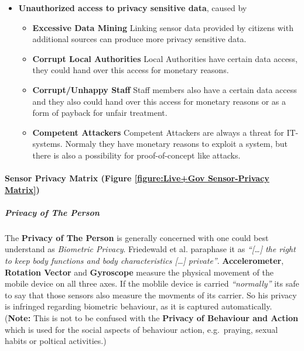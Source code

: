 

\begin{itemize}

\item
  \textbf{Unauthorized access to privacy sensitive data}, caused by
  \begin{itemize}
  \item
    \textbf{Excessive Data Mining} Linking sensor data provided by
    citizens with additional sources can produce more privacy sensitive
    data.
  \item
    \textbf{Corrupt Local Authorities} Local Authorities have certain data
    access, they could hand over this access for monetary reasons.
  \item
    \textbf{Corrupt/Unhappy Staff} Staff members also have a certain data
    access and they also could hand over this access for monetary reasons
    or as a form of payback for unfair treatment.
  \item
    \textbf{Competent Attackers} Competent Attackers are always a threat
    for IT-systems. Normaly they have monetary reasons to exploit a
    system, but there is also a possibility for proof-of-concept like
    attacks.
  \end{itemize}
\end{itemize}


\paragraph{Sensor Privacy Matrix (Figure \ref{figure:Live+Gov Sensor-Privacy Matrix})}



\subparagraph{Privacy of The Person}

The \textbf{Privacy of The Person} is generally concerned with one could
best understand as \emph{Biometric Privacy}. Friedewald et al. paraphase
it as \emph{``{[}\ldots{}{]} the right to keep body functions and body
characteristics {[}\ldots{}{]} private''}. \textbf{Accelerometer},
\textbf{Rotation Vector} and \textbf{Gyroscope} measure the physical
movement of the mobile device on all three axes. If the moblile device
is carried \emph{``normally''} its safe to say that those sensors also
measure the movments of its carrier. So his privacy is infringed
regarding biometric behaviour, as it is captured automatically.
(\textbf{Note:} This is not to be confused with the \textbf{Privacy of
Behaviour and Action} which is used for the social aspects of behaviour
action, e.g.~praying, sexual habits or poltical activities.)

